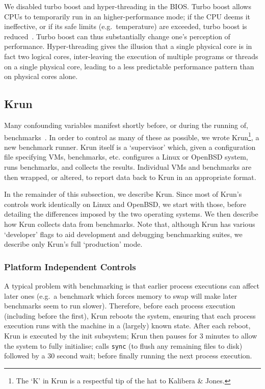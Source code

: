 \documentclass[acmlarge]{acmart}\settopmatter{printfolios=true}
\newcommand{\kalibera}{Kalibera \& Jones\xspace}
\newcommand{\krun}{Krun\xspace}
\begin{document}
We disabled turbo boost and hyper-threading in the BIOS. Turbo boost
allows CPUs to temporarily run in an higher-performance
mode; if the CPU deems it ineffective, or if its safe limits (e.g.~temperature) are exceeded,
turbo boost is reduced~\cite{charles09turboboost}. Turbo boost
can thus substantially change one's
perception of performance. Hyper-threading gives the illusion that a single
physical core is in fact two logical cores, inter-leaving the
execution of multiple programs or threads on a single physical core,
leading to a less predictable performance pattern
than on physical cores alone.


\subsection{\krun}
\label{krun}

Many confounding variables manifest shortly before, or during the running of,
benchmarks~\cite{kalibera05precision}. In order to control as many of these as possible, we wrote
\krun\footnote{The `K' in Krun is a respectful tip of the hat to \kalibera.}, a new benchmark runner. \krun itself is a `supervisor'
which, given a configuration file specifying VMs, benchmarks, etc. configures
a Linux or OpenBSD system, runs benchmarks, and collects the results. Individual VMs and benchmarks
are then wrapped, or altered, to report data back to \krun in an appropriate format.

In the remainder of this subsection, we describe \krun. Since most of \krun's
controls work identically on Linux and OpenBSD, we start with those,
before detailing the differences imposed by the two operating systems. We then
describe how \krun collects data from benchmarks.
Note that, although \krun has various `developer' flags to aid development
and debugging benchmarking suites, we describe only \krun's full `production' mode.


\subsubsection{Platform Independent Controls}

A typical problem with benchmarking is that earlier process executions can
affect later ones (e.g.~a benchmark which forces memory to swap will make
later benchmarks seem to run slower). Therefore, before each process execution
(including before the first), \krun reboots the system, ensuring that each
process execution runs with the machine in a (largely) known state. After each reboot, \krun is
executed by the init subsystem; \krun then pauses for 3
minutes to allow the system to fully initialise; calls \texttt{sync} (to
flush any remaining files to disk) followed by a 30 second wait; before finally running the
next process execution.
\end{document}
